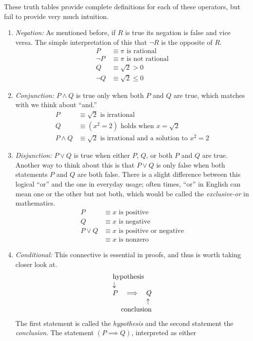 \documentclass[twoside]{report}
\begin{document}
These truth tables provide complete definitions for each of these operators, but fail to provide very much intuition.

\begin{enumerate}
	\item \emph{Negation:} As mentioned before, if $R$ is true its negation is false and vice versa. The simple interpretation of this that $\neg R$ is the opposite of $R$.
	\begin{align*}
		P &\equiv \text{$\pi$ is rational} \\
		\neg P &\equiv \text{$\pi$ is not rational} \\
		Q &\equiv \sqrt{2} > 0 \\
		\neg Q &\equiv \sqrt{2} \le 0
	\end{align*}
	
	\item \emph{Conjunction:} $P \wedge Q$ is true only when both $P$ and $Q$ are true, which matches with we think about ``and.''
	\begin{align*}
		P &\equiv \text{$\sqrt{2}$ is irrational} \\
		Q &\equiv \text{$(x^2 = 2)$ holds when $x = \sqrt{2}$} \\
		P \wedge Q &\equiv \text{$\sqrt{2}$ is irrational and a solution to $x^2 = 2$}
	\end{align*}

	\item \emph{Disjunction:} $P \lor Q$ is true when either $P$, $Q$, or both $P$ and $Q$ are true. Another way to think about this is that  $P \lor Q$ is only false when both statements $P$ and $Q$ are both false. There is a slight difference between this logical ``or'' and the one in everyday usage; often times, ``or'' in English can mean one or the other but not both, which would be called the \emph{exclusive-or} in mathematics.
	\begin{align*}
		P &\equiv \text{$x$ is positive} \\
		Q &\equiv \text{$x$ is negative} \\
		P \lor Q &\equiv \text{$x$ is positive or negative} \\
		&\equiv \text{$x$ is nonzero}
	\end{align*}
	
	\item \emph{Conditional:} This connective is essential in proofs, and thus is worth taking closer look at.
	\begin{align*}
	\begin{array}{lll}
		\multicolumn{3}{l}{\text{hypothesis}} \\
		\downarrow && \\
		P & \implies & Q \\
		&& \uparrow \\
		\multicolumn{3}{r}{\text{conclusion}}
	\end{array}
	\end{align*}
	The first statement is called the \emph{hypothesis} and the second statement the \emph{conclusion}. The statement $(P \implies Q)$, interpreted as either
	

\end{enumerate}
\end{document}

